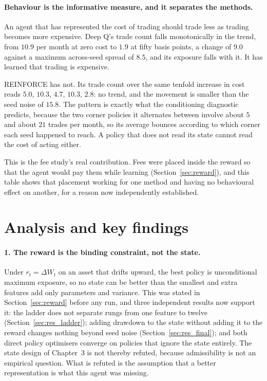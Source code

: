 \paragraph{Behaviour is the informative measure, and it separates the methods.}
An agent that has represented the cost of trading should trade less as trading
becomes more expensive. Deep Q's trade count falls monotonically in the trend,
from $10.9$ per month at zero cost to $1.9$ at fifty basis points, a change of
$9.0$ against a maximum across-seed spread of $8.5$, and its exposure falls with
it. It has learned that trading is expensive.

REINFORCE has not. Its trade count over the same tenfold increase in cost reads
$5.0$, $10.3$, $4.7$, $10.3$, $2.8$: no trend, and the movement is smaller than
the seed noise of $15.8$. The pattern is exactly what the conditioning
diagnostic predicts, because the two corner policies it alternates between
involve about $5$ and about $21$ trades per month, so its average bounces
according to which corner each seed happened to reach. A policy that does not
read its state cannot read the cost of acting either.

This is the fee study's real contribution. Fees were placed inside the reward so
that the agent would pay them while learning
(Section~\ref{sec:reward}), and this table shows that placement working for one
method and having no behavioural effect on another, for a reason now
independently established.

\section{Analysis and key findings}
\label{sec:res_analysis}

\paragraph{1. The reward is the binding constraint, not the state.} Under
$r_t = \Delta W_t$ on an asset that drifts upward, the best policy is
unconditional maximum exposure, so no state can be better than the smallest and
extra features add only parameters and variance. This was stated in
Section~\ref{sec:reward} before any run, and three independent results now
support it: the ladder does not separate rungs from one feature to twelve
(Section~\ref{sec:res_ladder}); adding drawdown to the state without adding it to
the reward changes nothing beyond seed noise (Section~\ref{sec:res_final}); and
both direct policy optimisers converge on policies that ignore the state
entirely. The state design of Chapter~3 is not thereby refuted, because
admissibility is not an empirical question. What is refuted is the assumption
that a better representation is what this agent was missing.

